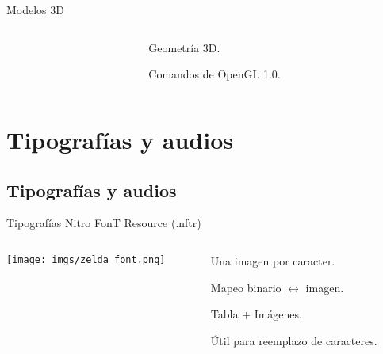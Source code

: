 \begin{frame}{Modelos 3D}
    \begin{columns}
    \begin{column}{0.6\textwidth}
    \end{column}
    \begin{column}{0.5\textwidth}
        \begin{wideitemize}
            \item<1-> Geometría 3D.
            \item<2-> Comandos de OpenGL 1.0.
        \end{wideitemize}
    \end{column}
    \end{columns}

\end{frame}

\section{Tipografías y audios}
\subsection{Tipografías y audios}
\begin{frame}{Tipografías}
    \centering{}Nitro FonT Resource (.nftr) \\ \vspace{5pt}
    \begin{columns}
    \begin{column}{0.5\textwidth}
        \texttt{[image: imgs/zelda\_font.png]}
    \end{column}
    \begin{column}{0.6\textwidth}
        \begin{wideitemize}
            \item<+-> Una imagen por caracter.
            \item<+-> Mapeo binario $\leftrightarrow$ imagen.
            \item<+-> Tabla + Imágenes.
            \item<+-> Útil para reemplazo de caracteres.
        \end{wideitemize}
    \end{column}
    \end{columns}
\end{frame}

